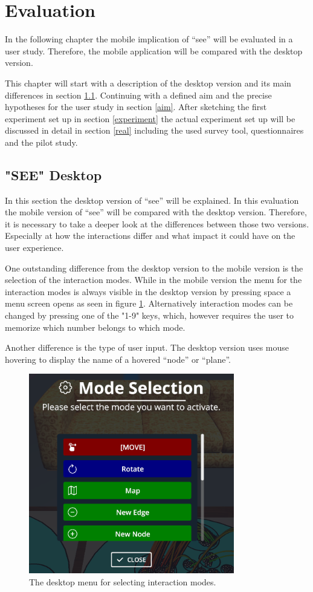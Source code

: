 \section{Evaluation}
In the following chapter the mobile implication of \enquote{\gls{see}} will be evaluated in a user study.
Therefore, the mobile application will be compared with the desktop version.

This chapter will start with a description of the desktop version and its main differences in section \ref{desktop}. 
Continuing with a defined aim and the precise hypotheses for the user study in section \ref{aim}.
After sketching the first experiment set up in section \ref{experiment} the actual experiment set up will be discussed in detail in section \ref{real} including the used survey tool, questionnaires and the pilot study.
\subsection{"SEE" Desktop}
\label{desktop}
In this section the desktop version of \enquote{\gls{see}} will be explained. 
In this evaluation the mobile version of \enquote{\gls{see}} will be compared with the desktop version.
Therefore, it is necessary to take a deeper look at the differences between those two versions.
Especially at how the interactions differ and what impact it could have on the user experience.

One outstanding difference from the desktop version to the mobile version is the selection of the interaction modes.
While in the mobile version the menu for the interaction modes is always visible in the desktop version by pressing space a menu screen opens as seen in figure \ref{fig:menu}.
Alternatively interaction modes can be changed by pressing one of the "1-9" keys, which, however requires the user to memorize which number belongs to which mode.

Another difference is the type of user input.
The desktop version uses mouse hovering to display the name of a hovered \enquote{\gls{node}} or \enquote{\gls{plane}}.
\begin{figure}[htb]
  \centering
  \includegraphics[width=0.8\textwidth]{Evaluation/img/menu.png}
  \caption{The desktop menu for selecting interaction modes.}\label{fig:menu}
\end{figure}
